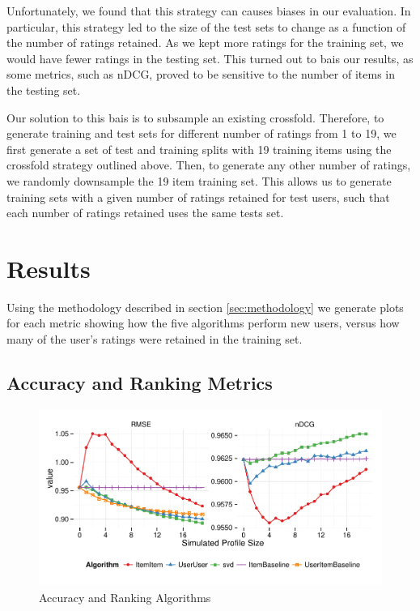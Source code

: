 \documentclass[letterpaper]{sig-alternate}
\begin{document}
  Unfortunately, we found that this strategy can causes biases in our evaluation.
  In particular, this strategy led to the size of the test sets to change as a function of the number of ratings retained.
  As we kept more ratings for the training set, we would have fewer ratings in the testing set.
  This turned out to bais our results, as some metrics, such as nDCG, proved to be sensitive to the number of items in the testing set.
  
  Our solution to this bais is to subsample an existing crossfold.
  Therefore, to generate training and test sets for different number of ratings from 1 to 19, we first generate a set of test and training splits with 19 training items using the crossfold strategy outlined above.
  Then, to generate any other number of ratings, we randomly downsample the 19 item training set.
  This allows us to generate training sets with a given number of ratings retained for test users, such that each number of ratings retained uses the same tests set.


\section{Results}

  Using the methodology described in section \ref{sec:methodology} we generate plots for each metric showing how the five algorithms perform new users, versus how many of the user's ratings were retained in the training set.

  
\subsection{Accuracy and Ranking Metrics}

\begin{figure}[ht!]
  \centering
  \includegraphics[width=0.75\linewidth]{../lenskit/output/ekstrandTuned20/accuracy.pdf}
  \caption{Accuracy and Ranking Algorithms}
  \label{fig:rmse}
  \label{fig:ndcg}
\end{figure}
\end{document}
